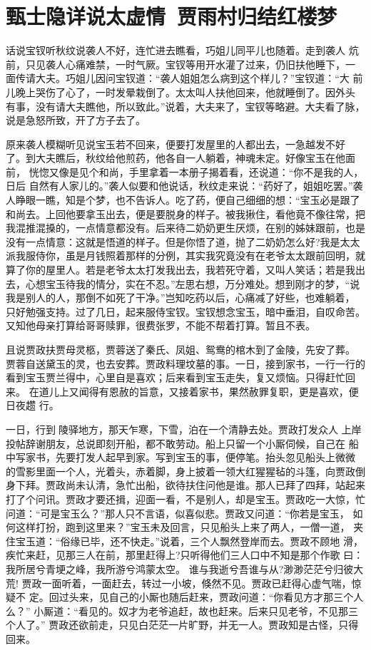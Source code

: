 \chapter{甄士隐详说太虚情~贾雨村归结红楼梦}

话说宝钗听秋纹说袭人不好，连忙进去瞧看，巧姐儿同平儿也随着。走到袭人
炕前，只见袭人心痛难禁，一时气厥。宝钗等用开水灌了过来，仍旧扶他睡下，一
面传请大夫。巧姐儿因问宝钗道：“袭人姐姐怎么病到这个样儿？”宝钗道：“大
前儿晚上哭伤了心了，一时发晕栽倒了。太太叫人扶他回来，他就睡倒了。因外头
有事，没有请大夫瞧他，所以致此。”说着，大夫来了，宝钗等略避。大夫看了脉，
说是急怒所致，开了方子去了。

原来袭人模糊听见说宝玉若不回来，便要打发屋里的人都出去，一急越发不好
了。到大夫瞧后，秋纹给他煎药，他各自一人躺着，神魂未定。好像宝玉在他面前，
恍惚又像是见个和尚，手里拿着一本册子揭着看，还说道：“你不是我的人，日后
自然有人家儿的。”袭人似要和他说话，秋纹走来说：“药好了，姐姐吃罢。”袭
人睁眼一瞧，知是个梦，也不告诉人。吃了药，便自己细细的想：“宝玉必是跟了
和尚去。上回他要拿玉出去，便是要脱身的样子。被我揪住，看他竟不像往常，把
我混推混搡的，一点情意都没有。后来待二奶奶更生厌烦，在别的姊妹跟前，也是
没有一点情意：这就是悟道的样子。但是你悟了道，抛了二奶奶怎么好?我是太太
派我服侍你，虽是月钱照着那样的分例，其实我究竟没有在老爷太太跟前回明，就
算了你的屋里人。若是老爷太太打发我出去，我若死守着，又叫人笑话；若是我出
去，心想宝玉待我的情分，实在不忍。”左思右想，万分难处。想到刚才的梦，“说
我是别人的人，那倒不如死了干净。”岂知吃药以后，心痛减了好些，也难躺着，
只好勉强支持。过了几日，起来服侍宝钗。宝钗想念宝玉，暗中垂泪，自叹命苦。
又知他母亲打算给哥哥赎罪，很费张罗，不能不帮着打算。暂且不表。

且说贾政扶贾母灵柩，贾蓉送了秦氏、凤姐、鸳鸯的棺木到了金陵，先安了葬。
贾蓉自送黛玉的灵，也去安葬。贾政料理坟墓的事。一日，接到家书，一行一行的
看到宝玉贾兰得中，心里自是喜欢；后来看到宝玉走失，复又烦恼。只得赶忙回来。
在道儿上又闻得有恩赦的旨意，又接着家书，果然赦罪复职，更是喜欢，便日夜趱
行。

一日，行到陵驿地方，那天乍寒，下雪，泊在一个清静去处。贾政打发众人
上岸投帖辞谢朋友，总说即刻开船，都不敢劳动。船上只留一个小厮伺候，自己在
船中写家书，先要打发人起早到家。写到宝玉的事，便停笔。抬头忽见船头上微微
的雪影里面一个人，光着头，赤着脚，身上披着一领大红猩猩毡的斗篷，向贾政倒
身下拜。贾政尚未认清，急忙出船，欲待扶住问他是谁。那人已拜了四拜，站起来
打了个问讯。贾政才要还揖，迎面一看，不是别人，却是宝玉。贾政吃一大惊，忙
问道：“可是宝玉么？”那人只不言语，似喜似悲。贾政又问道：“你若是宝玉，
如何这样打扮，跑到这里来？”宝玉未及回言，只见船头上来了两人，一僧一道，
夹住宝玉道：“俗缘已毕，还不快走。”说着，三个人飘然登岸而去。贾政不顾地
滑，疾忙来赶，见那三人在前，那里赶得上?只听得他们三人口中不知是那个作歌
曰：
我所居兮青埂之峰，我所游兮鸿蒙太空。
谁与我逝兮吾谁与从?渺渺茫茫兮归彼大荒!
贾政一面听着，一面赶去，转过一小坡，倏然不见。贾政已赶得心虚气喘，惊疑不
定。回过头来，见自己的小厮也随后赶来，贾政问道：“你看见方才那三个人么？”
小厮道：“看见的。奴才为老爷追赶，故也赶来。后来只见老爷，不见那三个人了。”
贾政还欲前走，只见白茫茫一片旷野，并无一人。贾政知是古怪，只得回来。

